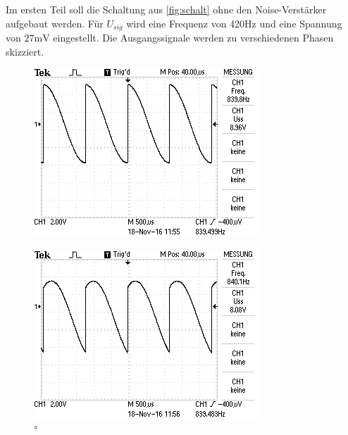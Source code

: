 Im ersten Teil soll die Schaltung aus \ref{fig:schalt} ohne den Noise-Verstärker
aufgebaut werden. Für $U_{sig}$ wird eine Frequenz von 420$\si{\hertz}$ und eine
Spannung von $27\si{\milli\volt}$ eingestellt. Die Ausgangssignale werden zu
verschiedenen Phasen skizziert.
\begin{figure}[!h]
  \begin{minipage}[t]{0.3\textwidth}
    \includegraphics[width=\textwidth]{Bilder/15.jpeg}
    \label{fig:15}
    \caption{\si{\degree}}
  \end{minipage}
  \hspace{12pt}
  \vspace{5pt}
  \begin{minipage}[t]{0.3\textwidth}
    \includegraphics[width=\textwidth]{Bilder/45.jpeg}

\end{minipage}
\end{figure}
